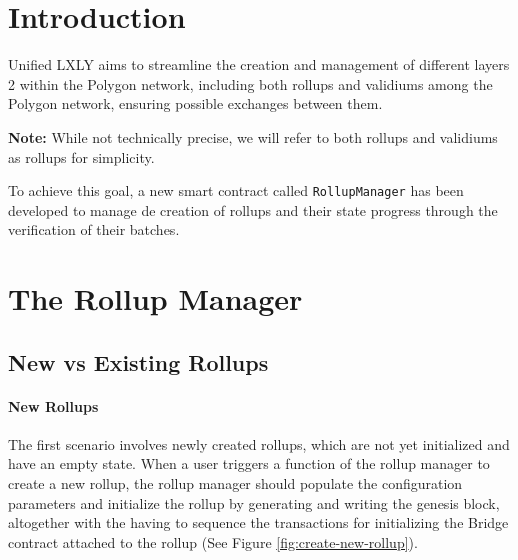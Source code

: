 


\section{Introduction}

Unified LXLY aims to streamline the creation and management of different layers 2 within the Polygon network, including both rollups and validiums among the Polygon network, ensuring possible exchanges between them.

\vspace{1em}

\textbf{Note:} While not technically precise, we will refer to both rollups and validiums as rollups for simplicity.

\vspace{1em}

To achieve this goal, a new smart contract called \texttt{RollupManager} has been developed to manage de creation of rollups and their state progress through the verification of their batches.




\section{The Rollup Manager}



\subsection{New vs Existing Rollups}


\paragraph*{New Rollups}

The first scenario involves newly created rollups, which are not yet initialized and have an empty state. When a user triggers a function of the rollup manager to create a new rollup, the rollup manager should populate the configuration parameters and initialize the rollup by generating and writing the genesis block, altogether with the having to sequence the transactions for initializing the Bridge contract attached to the rollup (See Figure \ref{fig:create-new-rollup}).

